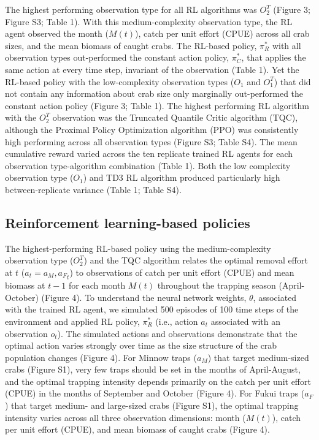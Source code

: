 \documentclass{article}
\begin{document}
The highest performing observation type for all RL algorithms was $O_2^T$ (Figure 3; Figure S3; Table 1). With this medium-complexity observation type, the RL agent observed the month ($M(t)$), catch per unit effort (CPUE) across all crab sizes, and the mean biomass of caught crabs. The RL-based policy, $\pi^*_R$ with all observation types out-performed the constant action policy, $\pi^*_C$, that applies the same action at every time step, invariant of the observation (Table 1). Yet the RL-based policy with the low-complexity observation types ($O_1$ and $O_1^T$) that did not contain any information about crab size only marginally out-performed the constant action policy (Figure 3; Table 1). The highest performing RL algorithm with the $O_2^T$ observation was the Truncated Quantile Critic algorithm (TQC), although the Proximal Policy Optimization algorithm (PPO) was consistently high performing across all observation types (Figure S3; Table S4). The mean cumulative reward varied across the ten replicate trained RL agents for each observation type-algorithm combination (Table 1). Both the low complexity observation type ($O_1$) and TD3 RL algorithm produced particularly high between-replicate variance (Table 1; Table S4).

\subsection{Reinforcement learning-based policies}

The highest-performing RL-based policy using the medium-complexity observation type ($O^T_2$) and the TQC algorithm relates the optimal removal effort at $t$ ($a_t = {a_M, a_F}_t$) to observations of catch per unit effort (CPUE) and mean biomass at $t-1$ for each month $M(t)$ throughout the trapping season (April-October) (Figure 4). To understand the neural network weights, $\theta$, associated with the trained RL agent, we simulated 500 episodes of 100 time steps of the environment and applied RL policy, $\pi^*_R$ (i.e., action $a_t$ associated with an observation $o_t$). The simulated actions and observations demonstrate that the optimal action varies strongly over time as the size structure of the crab population changes (Figure 4). For Minnow traps ($a_M$) that target medium-sized crabs (Figure S1), very few traps should be set in the months of April-August, and the optimal trapping intensity depends primarily on the catch per unit effort (CPUE) in the months of September and October (Figure 4). For Fukui traps ($a_F$) that target medium- and large-sized crabs (Figure S1), the optimal trapping intensity varies across all three observation dimensions: month ($M(t)$), catch per unit effort (CPUE), and mean biomass of caught crabs (Figure 4).
\end{document}
